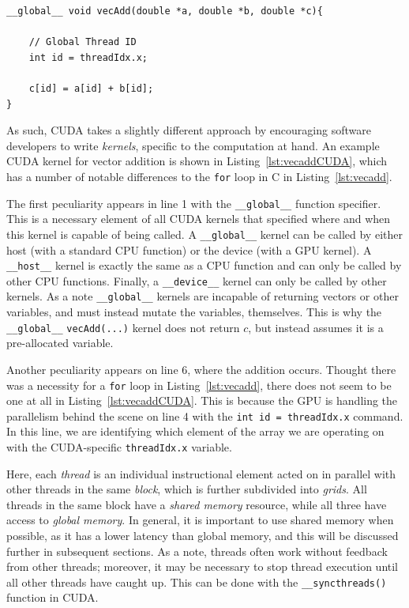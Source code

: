 \begin{lstlisting}[float,label=lst:vecaddCUDA, style=c++,caption=An example of a vector addition kernel in CUDA]
__global__ void vecAdd(double *a, double *b, double *c){

    // Global Thread ID
    int id = threadIdx.x;

    c[id] = a[id] + b[id];
}
\end{lstlisting}

As such, CUDA takes a slightly different approach by encouraging software developers to write \textit{kernels}, specific to the computation at hand.
An example CUDA kernel for vector addition is shown in Listing~\ref{lst:vecaddCUDA}, which has a number of notable differences to the \texttt{for} loop in C in Listing~\ref{lst:vecadd}.

The first peculiarity appears in line 1 with the \texttt{\_\_global\_\_} function specifier.
This is a necessary element of all CUDA kernels that specified where and when this kernel is capable of being called.
A \texttt{\_\_global\_\_} kernel can be called by either host (with a standard CPU function) or the device (with a GPU kernel).
A \texttt{\_\_host\_\_} kernel is exactly the same as a CPU function and can only be called by other CPU functions.
Finally, a \texttt{\_\_device\_\_} kernel can only be called by other kernels.
As a note \texttt{\_\_global\_\_} kernels are incapable of returning vectors or other variables, and must instead mutate the variables, themselves.
This is why the \texttt{\_\_global\_\_} \texttt{vecAdd(...)} kernel does not return $c$, but instead assumes it is a pre-allocated variable.

Another peculiarity appears on line 6, where the addition occurs.
Thought there was a necessity for a \texttt{for} loop in Listing~\ref{lst:vecadd}, there does not seem to be one at all in Listing~\ref{lst:vecaddCUDA}.
This is because the GPU is handling the parallelism behind the scene on line 4 with the \texttt{int id = threadIdx.x} command.
In this line, we are identifying which element of the array we are operating on with the CUDA-specific \texttt{threadIdx.x} variable.

Here, each \textit{thread} is an individual instructional element acted on in parallel with other threads in the same \textit{block}, which is further subdivided into \textit{grids}.
All threads in the same block have a \textit{shared memory} resource, while all three have access to \textit{global memory}.
In general, it is important to use shared memory when possible, as it has a lower latency than global memory, and this will be discussed further in subsequent sections.
As a note, threads often work without feedback from other threads; moreover, it may be necessary to stop thread execution until all other threads have caught up.
This can be done with the \texttt{\_\_syncthreads()} function in CUDA.

